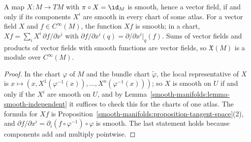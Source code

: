 \begin{lemma}\label{smooth-manifolds:lemma-vector-field-local}
A map $X \colon M \to TM$ with $\pi \circ X = \id_M$ is smooth, hence a vector field, if and only if its components $X^i$ are smooth in every chart of some
atlas. For a vector field $X$ and $f \in C^\infty(M)$, the function $Xf$ is smooth; in a chart, $Xf = \sum_iX^i\,\partial f/\partial x^i$ with
$\partial f/\partial x^i(q) = \partial/\partial x^i|_q(f)$. Sums of vector fields and products of vector fields with smooth functions are vector fields, so
$\mathfrak{X}(M)$ is a module over $C^\infty(M)$.
\end{lemma}

\begin{proof}
In the chart $\varphi$ of $M$ and the bundle chart $\widetilde{\varphi}$, the local representative of $X$ is
$x \mapsto (x, X^1(\varphi^{-1}(x)), \ldots, X^n(\varphi^{-1}(x)))$; so $X$ is smooth on $U$ if and only if the $X^i$ are smooth on $U$, and by
Lemma~\ref{smooth-manifolds:lemma-smooth-independent} it suffices to check this for the charts of one atlas. The formula for $Xf$ is
Proposition~\ref{smooth-manifolds:proposition-tangent-space}(2), and $\partial f/\partial x^i = \partial_i(f \circ \varphi^{-1}) \circ \varphi$ is smooth. The last
statement holds because components add and multiply pointwise.
\end{proof}

